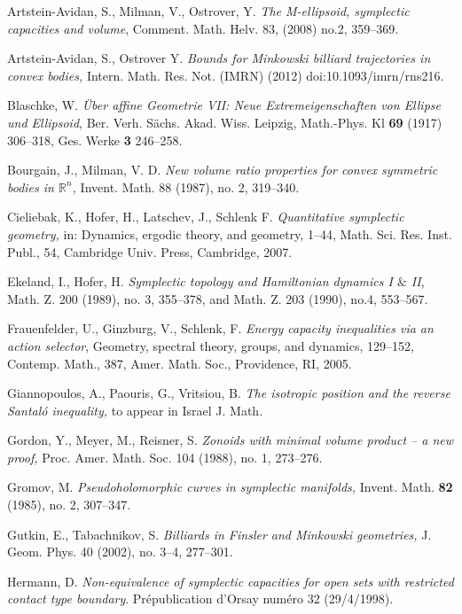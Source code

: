\documentclass[11pt]{article}
\begin{document}
{\begin{thebibliography}{}
 Artstein-Avidan, S., Milman, V., Ostrover, Y. {\it The M-ellipsoid,
symplectic capacities and volume}, Comment. Math.
Helv. 83, (2008) no.2, 359--369.


 Artstein-Avidan, S., Ostrover Y. {\it  Bounds for Minkowski billiard trajectories in convex bodies,} 
Intern. Math. Res. Not. (IMRN) (2012) doi:10.1093/imrn/rns216.


 Blaschke, W. {\it \"Uber affine Geometrie VII: Neue Extremeigenschaften
von Ellipse und Ellipsoid}, Ber. Verh. S\"achs. Akad. Wiss. Leipzig,
Math.-Phys. Kl {\bf 69} (1917) 306--318, Ges. Werke {\bf 3} 246--258.

 Bourgain, J., Milman, V. D. {\it New volume ratio properties for convex
symmetric bodies in ${\mathbb R}^n$,} Invent. Math. 88 (1987), no.
2, 319--340.

 Cieliebak, K., Hofer, H., Latschev, J., Schlenk
F. {\it Quantitative symplectic geometry,} in: Dynamics, ergodic theory,
and geometry, 1--44, Math. Sci. Res. Inst. Publ., 54, Cambridge Univ.
Press, Cambridge, 2007.

 Ekeland, I., Hofer, H. {\it Symplectic topology
and Hamiltonian dynamics I $\&$ II}, Math. Z. 200 (1989), no. 3, 355--378, and Math. Z.  203 (1990), no.4, 553--567.

 Frauenfelder, U., Ginzburg, V., Schlenk, F. {\it Energy capacity
inequalities via an action selector},  Geometry, spectral theory,
groups, and dynamics, 129--152, Contemp. Math., 387, Amer. Math.
Soc., Providence, RI, 2005.


 Giannopoulos, A., Paouris, G., Vritsiou, B. {\it The isotropic position and the reverse Santal\'o inequality,}
to appear in Israel J. Math.

 Gordon, Y., Meyer,  M.,  Reisner, S. {\it Zonoids with minimal
volume product -- a new proof,} Proc. Amer. Math. Soc.
104 (1988), no. 1, 273--276.

 Gromov, M. {\it Pseudoholomorphic curves in symplectic manifolds,}
Invent. Math. {\bf 82} (1985), no. 2, 307--347.


 Gutkin, E., Tabachnikov, S. {\it Billiards in Finsler and Minkowski geometries,}
J. Geom. Phys. 40 (2002), no. 3--4, 277--301.


 Hermann, D. {\it Non-equivalence of symplectic capacities for open
sets with restricted contact type boundary}. Pr\'epublication
d'Orsay num\'ero 32 (29/4/1998).


\end{thebibliography}}
\end{document}
